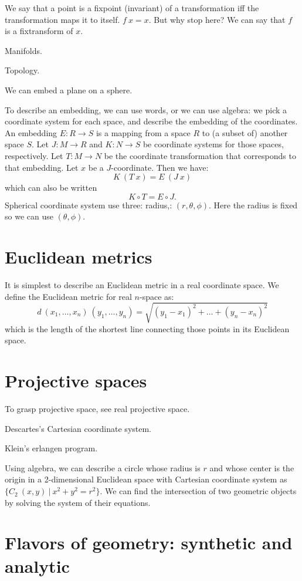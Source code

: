 We say that a point is a fixpoint (invariant)
of a transformation iff the transformation maps it to itself.
$f~x = x$.
But why stop here?
We can say that $f$ is a fixtransform of $x$.

Manifolds.

Topology.

We can embed a plane on a sphere.

To describe an embedding,
we can use words, or we can use algebra:
we pick a coordinate system for each space,
and describe the embedding of the coordinates.
An embedding $E : R \to S$ is a mapping from a space $R$ to (a subset of) another space $S$.
Let $J : M \to R$ and $K : N \to S$ be coordinate systems for those spaces, respectively.
Let $T : M \to N$ be the coordinate transformation that corresponds to that embedding.
Let $x$ be a $J$-coordinate.
Then we have:
\[
K~(T~x) = E~(J~x)
\]
which can also be written
\[
K \circ T = E \circ J.
\]
Spherical coordinate system
use three: radius,: $(r,\theta,\phi)$. Here the radius is fixed so we can use $(\theta,\phi)$.

\section{Euclidean metrics}

It is simplest to describe an Euclidean metric in a real coordinate space.
We define the Euclidean metric for real $n$-space as:
\[
d~(x_1,\ldots,x_n)~(y_1,\ldots,y_n) = \sqrt{(y_1-x_1)^2+\ldots+(y_n-x_n)^2}
\]
which is the length of the shortest line connecting those points in its Euclidean space.

\section{Projective spaces}

To grasp projective space, see real projective space.

Descartes's Cartesian coordinate system.

Klein's erlangen program.

Using algebra, we can describe a circle whose radius is $r$
and whose center is the origin in a 2-dimensional Euclidean space with Cartesian coordinate system
as $\{C_2~(x,y) ~|~ x^2+y^2 = r^2\}$.
We can find the intersection of two geometric objects
by solving the system of their equations.

\section{Flavors of geometry: synthetic and analytic}


